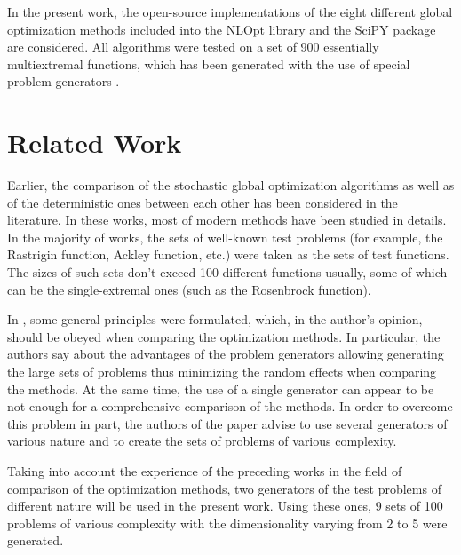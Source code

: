 \documentclass[runningheads]{llncs}
\begin{document}
In the present work, the open-source implementations of the eight different global optimization
methods included into the NLOpt library \cite{nlopt} and the SciPY package \cite{scipy} are
considered.
All algorithms were tested on a set of 900 essentially multiextremal functions, which has been
generated with the use of special problem generators \cite{Gaviano2003, grishaginClass}.

\section{Related Work}

Earlier, the comparison of the stochastic global optimization algorithms \cite{Ali2005, JSSv060i06}
as well as of the deterministic ones \cite{posik2012, KVASOV2018245, Liberti2005} between each
other has been considered in the literature. In these works, most of modern methods have
been studied in details. In the majority of works, the sets of well-known test problems (for example, the Rastrigin
function, Ackley function, etc.) were taken as the sets of test functions. The sizes of such sets don't
exceed 100 different functions usually, some of which can be the single-extremal ones (such as the
Rosenbrock function).

In \cite{Beiranvand2017}, some general principles were formulated, which, in the author's
opinion, should be obeyed when comparing the optimization methods. In particular, the authors say
about the advantages of the problem generators allowing generating the large sets of problems thus
minimizing the random effects when comparing the methods. At the same time, the use of a single
generator can appear to be not enough for a comprehensive comparison of the methods. In order to
overcome this problem in part, the authors of the paper \cite{Beiranvand2017} advise to use several
generators of various nature and to create the sets of problems of various complexity.

Taking into account the experience of the preceding works in the field of comparison of the
optimization methods, two generators of the test problems of different nature will be used in the
present work. Using these ones, 9 sets of 100 problems of various complexity with the
dimensionality varying from 2 to 5 were generated.
\end{document}
